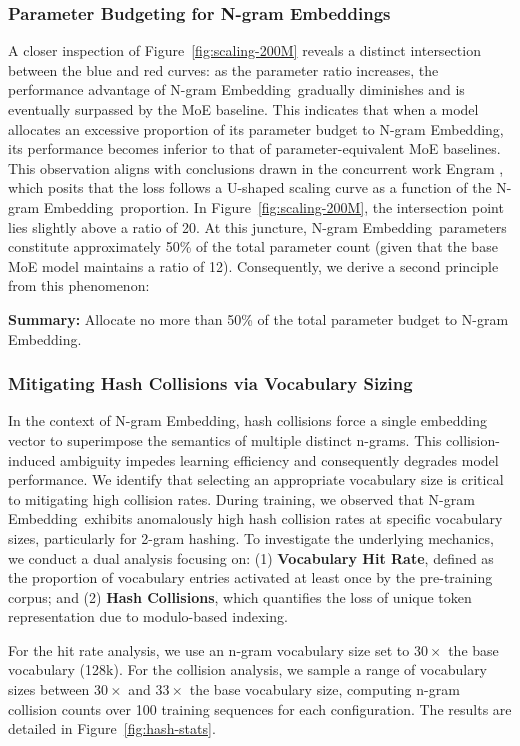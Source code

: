 \documentclass{article}
\newcommand{\method}{N-gram Embedding}
\begin{document}
\subsubsection{Parameter Budgeting for N-gram Embeddings} 
A closer inspection of Figure~\ref{fig:scaling-200M} reveals a distinct intersection between the blue and red curves: as the parameter ratio increases, the performance advantage of \method\ gradually diminishes and is eventually surpassed by the MoE baseline.
This indicates that when a model allocates an excessive proportion of its parameter budget to \method, its performance becomes inferior to that of parameter-equivalent MoE baselines. This observation aligns with conclusions drawn in the concurrent work Engram \citep{cheng2026conditional}, which posits that the loss follows a U-shaped scaling curve as a function of the \method\ proportion. In Figure~\ref{fig:scaling-200M}, the intersection point lies slightly above a ratio of 20. At this juncture, \method\ parameters constitute approximately 50\% of the total parameter count (given that the base MoE model maintains a ratio of 12). Consequently, we derive a second principle from this phenomenon:
\begin{summarybox}
\textbf{Summary:} Allocate no more than 50\% of the total parameter budget to \method.
\end{summarybox}

\subsubsection{Mitigating Hash Collisions via Vocabulary Sizing}

In the context of \method, hash collisions force a single embedding vector to superimpose the semantics of multiple distinct n-grams. This collision-induced ambiguity impedes learning efficiency and consequently degrades model performance. We identify that selecting an appropriate vocabulary size is critical to mitigating high collision rates. During training, we observed that \method\ exhibits anomalously high hash collision rates at specific vocabulary sizes, particularly for 2-gram hashing. To investigate the underlying mechanics, we conduct a dual analysis focusing on: (1) \textbf{Vocabulary Hit Rate}, defined as the proportion of vocabulary entries activated at least once by the pre-training corpus; and (2) \textbf{Hash Collisions}, which quantifies the loss of unique token representation due to modulo-based indexing.

For the hit rate analysis, we use an n-gram vocabulary size set to $30\times$ the base vocabulary (128k). For the collision analysis, we sample a range of vocabulary sizes between $30\times$ and $33\times$ the base vocabulary size, computing n-gram collision counts over 100 training sequences for each configuration. The results are detailed in Figure~\ref{fig:hash-stats}.
\end{document}
